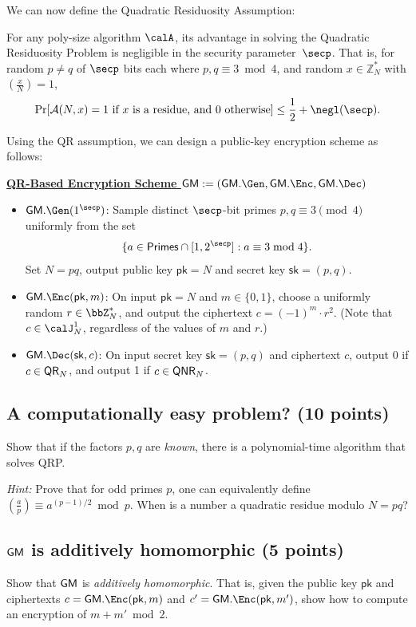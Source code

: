 \documentclass{article}
\newcommand{\proto}[2]{
    \stepcounter{figure}
    \vspace{0.05cm}
    { \small
    \begin{tcolorbox}[breakable]
        \begin{center}
            {\bf \underline{#1}}
        \end{center}
        #2
    \end{tcolorbox} }
}
\newcommand{\pk}{\mathsf{pk}}
\newcommand{\sk}{\mathsf{sk}}
\begin{document}
We can now define the Quadratic Residuosity Assumption:
\begin{assumption}
For any poly-size algorithm $\calA$, its advantage in solving the Quadratic Residuosity Problem is negligible in the security parameter~$\secp$.
That is, for random $p \neq q$ of $\secp$ bits each where $p, q \equiv 3 \bmod{4}$, and random
$x \in \mathbb{Z}_N^*$ with $\left( \frac{x}{N} \right) = 1$,
    \[ \Pr[\mathcal{A}(N, x) = 1 \text{ if } x \text{ is a residue, and } 0 \text{ otherwise}]
\leq \frac{1}{2} + \negl(\secp). \]
\end{assumption}

\noindent Using the QR assumption, we can design a public-key encryption scheme as follows:
\proto{QR-Based Encryption Scheme $\GM := (\GM.\Gen, \GM.\Enc, \GM.\Dec)$}{
\begin{itemize}
	\item  $\GM.\Gen(1^{\secp})$: Sample distinct $\secp$-bit primes $p, q \equiv 3 \pmod{4}$
	uniformly from the set 
	   \[ \{a \in \Primes \cap [1, 2^{\secp}] : a \equiv 3 \bmod 4\}. \]
	Set $N = pq$, output public key $\pk = N$ and secret key $\sk = (p, q)$.
	
	\item $\GM.\Enc(\pk, m)$: On input $\pk = N$ and $m \in \{0,1\}$, choose a uniformly random $r \in \bbZ_N^*$, and output the ciphertext $c = (-1)^m \cdot r^2$. (Note that $c \in \calJ_N^1$, regardless of the values of $m$ and $r$.)
	
	\item $\GM.\Dec(\sk, c)$: On input secret key $\sk = (p, q)$ and ciphertext $c$,
	output 0 if $c \in \mathsf{QR}_N$, and output 1 if $c \in \mathsf{QNR}_N$.
\end{itemize}
}

\subsection{A computationally easy problem? (10 points)}
Show that if the factors $p, q$ are \emph{known}, there is a polynomial-time algorithm that solves QRP.

\emph{Hint:} Prove that for odd primes $p$, one can equivalently define $(\frac{a}{p}) \equiv a^{(p-1)/2} \bmod{p}$. When is a number a quadratic residue modulo $N = pq$? 

\subsection{$\mathsf{GM}$ is additively homomorphic (5 points)}
Show that $\mathsf{GM}$ is \emph{additively homomorphic}. That is, given the public key $\pk$ and ciphertexts $c = \GM.\Enc(\pk, m)$ and $c' = \GM.\Enc(\pk, m')$, show how to compute an encryption of $m + m' \bmod{2}$.
\end{document}
